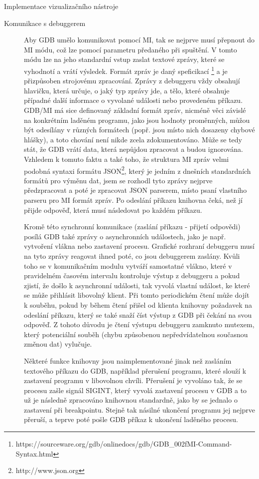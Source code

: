 \documentclass[bc,male,python,dept460]{diploma}						%
\newcommand{\parspace}[1][]{
	\ifthenelse{\isempty{#1}}{\vspace{5mm}}{\vspace{#1}}
	\par
}
\begin{document}
\begin{section}{Implementace vizualizačního nástroje}
		\begin{description}
			\item[Komunikace s debuggerem]
			Aby GDB umělo komunikovat pomocí MI, tak se nejprve musí přepnout do MI módu, což lze pomocí parametru předaného při spuštění. V tomto módu
			lze na jeho standardní vstup zaslat textové zprávy, které se vyhodnotí a vrátí výsledek. Formát zpráv je daný speficikací
			\footnote{https://sourceware.org/gdb/onlinedocs/gdb/GDB\_002fMI-Command-Syntax.html} a je přizpůsoben strojovému zpracování. Zprávy z debuggeru
			vždy obsahují hlavičku, která určuje, o jaký typ zprávy jde, a tělo, které obsahuje případné další informace o vyvolané události nebo
			provedeném příkazu. GDB/MI má sice definovaný základní formát zpráv, nicméně věci závislé na konkrétním laděném programu, jako jsou hodnoty proměnných,
			můžou být odesílány v různých formátech (popř. jsou místo nich dosazeny chybové hlášky), a toto chování není nikde zcela zdokumentováno.
			Může se tedy stát, že GDB vrátí data, která nepůjdou zpracovat a budou ignorována. Vzhledem k tomuto faktu a také toho, že
			struktura MI zpráv velmi podobná syntaxi formátu JSON\footnote{http://www.json.org}, který je jedním z dnešních standardních formátů pro výměnu dat,
			jsem se rozhodl tyto zprávy nejprve předzpracovat a poté je zpracovat JSON parserem, místo psaní vlastního parseru pro MI formát zpráv.
			Po odeslání příkazu knihovna čeká, než jí přijde odpověď, která musí následovat po každém příkazu.
			
			\parspace Kromě této synchronní komunikace (zaslání příkazu - přijetí odpovědi) posílá GDB také zprávy o asynchronních událostech, jako je např.
			vytvoření vlákna nebo zastavení procesu. Grafické rozhraní debuggeru musí na tyto zprávy reagovat ihned poté, co jsou debuggerem zaslány.
			Kvůli toho se v komunikačním modulu vytváří samostatné vlákno, které v pravidelném časovém intervalu kontroluje výstup z debuggeru a pokud zjistí, že došlo
			k asynchronní události, tak vyvolá vlastní událost, ke které se může přihlásit libovolný klient. Při tomto periodickém čtení může dojít k souběhu, pokud
			by během čtení přišel od klienta knihovny požadavek na odeslání příkazu, který se také snaží číst výstup z GDB při čekání na svou odpověď.
			Z tohoto důvodu je čtení výstupu debuggeru zamknuto mutexem\cite[80]{tanenbaum}, který potenciální souběh (chybu způsobenou nepředvídatelnou
			současnou změnou dat) vylučuje.
			
			\parspace Některé funkce knihovny jsou naimplementované jinak než zasláním textového příkazu do GDB, například přerušení programu, které
			slouží k zastavení programu v libovolnou chvíli. Přerušení je vyvoláno tak, že se procesu zašle signál SIGINT, který vyvolá zastavení procesu v GDB a to
			už je následně zpracováno knihovnou standardně, jako by se jednalo o zastavení při breakpointu. Stejně tak násilné ukončení programu jej nejprve přeruší,
			a teprve poté pošle GDB příkaz k ukončení laděného procesu.
			

\end{description}
\end{section}
\end{document}

